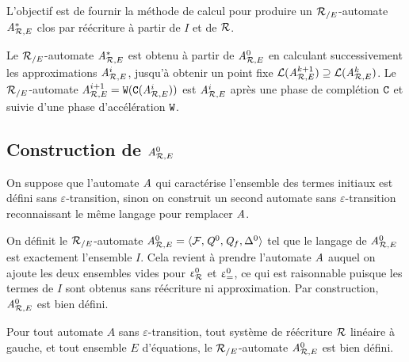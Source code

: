 L'objectif est de fournir la méthode de calcul pour produire un ${\mathcal R_{/E}}$-automate $\mathit A^*_{\mathcal R,E}$ 
clos par réécriture à partir de $I$ et de $\mathcal R$.

Le ${\mathcal R_{/E}}$-automate $\mathit A^*_{\mathcal R,E}$ est obtenu à partir de ${\mathit A}_{\mathcal R,E}^0$ en calculant
successivement les approximations ${\mathit A}_{\mathcal R,E}^i$, jusqu'à obtenir un point fixe
$\mathcal{L}({\mathit A}_{\mathcal R,E}^{k+1}) \supseteq \mathcal{L}({\mathit A}_{\mathcal R,E}^{k})$. Le ${\mathcal R_{/E}}$-automate ${\mathit A}_{\mathcal R,E}^{i+1}=\mathtt{W}(\mathtt{C}({\mathit A}_{\mathcal R,E}^i))$
est ${\mathit A}_{\mathcal R,E}^i$ après une phase de complétion $\mathtt{C}$ et suivie d'une phase d'accélération $\mathtt{W}$.


\subsection{Construction de ${\mathit A}_{\mathcal R,E}^0$}


On suppose que l'automate $\mathit A$ qui caractérise l'ensemble des termes initiaux 
est défini sans $\varepsilon$-transition, sinon on construit un second automate 
sans $\varepsilon$-transition reconnaissant le même langage pour remplacer $\mathit A$.

On définit le ${\mathcal R_{/E}}$-automate ${\mathit A}_{\mathcal R,E}^0 = \langle \mathcal{F}, \mathit Q^0, \mathit Q_f, \Delta^0\rangle$ tel que
le langage de ${\mathit A}_{\mathcal R,E}^0$ est exactement l'ensemble $I$. Cela revient à prendre 
l'automate $\mathit A$ auquel on ajoute les deux ensembles vides pour $\upvarepsilon_{\mathcal R}^0$ et $\upvarepsilon_{=}^0$, ce qui
est raisonnable puisque les termes de $I$ sont obtenus sans réécriture ni approximation.
Par construction, ${\mathit A}_{\mathcal R,E}^0$ est bien défini.

\begin{theorem}
  Pour tout automate $A$ sans $\varepsilon$-transition, tout système de réécriture $\mathcal R$
  linéaire à gauche, et tout ensemble $E$ d'équations, le ${\mathcal R_{/E}}$-automate ${\mathit A}_{\mathcal R,E}^0$ est bien défini.
\end{theorem}

